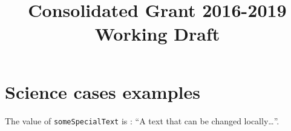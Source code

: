 \documentclass[11pt,a4paper]{article}
\author{}
\title{Consolidated Grant 2016-2019 Working Draft}
\makeatletter
\def\fullpath{\begingroup\everyeof{\noexpand}\@sanitize
  \edef\x{\@@input|"find `pwd` -name \jobname.tex" }%
  \edef\x{\endgroup\noexpand\zap@space\x\noexpand\@empty}\x}
\def\now{\number\hours:\ifnum\minutes<10 0\fi\number\minutes}
\makeatother
\begin{document}











\newpage
\clearpage

\ifdebuglayout

  

   \newpage

  \setcounter{section}{2}
  \section{Science cases examples}
  \newpage

  \setcounter{figure}{0}


  \newpage

  
  \newpage


  
  \newpage

  \newcommand{\someSpecialText}{A text that can be changed locally\ldots}
  \newcommand{\testIt}{The value of \texttt{someSpecialText} is : ``\someSpecialText''.}

  \testIt


  \newpage


  
  \newpage
\end{document}
